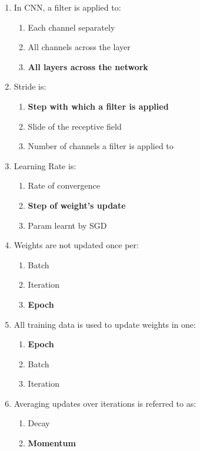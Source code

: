 \documentclass{report}
\numberwithin{equation}{section}
\begin{document}
\begin{enumerate}
    \item In CNN, a filter is applied to:
    \begin{enumerate}[label=\alph*.]
        \item Each channel separately
        \item All channels across the layer
        \item \textbf{All layers across the network}
    \end{enumerate}
    \item Stride is:
    \begin{enumerate}[label=\alph*.]
        \item \textbf{Step with which a filter is applied}
        \item Slide of the receptive field
        \item Number of channels a filter is applied to
    \end{enumerate}
    \item Learning Rate is:
    \begin{enumerate}[label=\alph*.]
        \item Rate of convergence
        \item \textbf{Step of weight's update}
        \item Param learnt by SGD
    \end{enumerate}
    \item Weights are not updated once per:
    \begin{enumerate}[label=\alph*.]
        \item Batch
        \item Iteration
        \item \textbf{Epoch}
    \end{enumerate}
    \item All training data is used to update weights in one:
    \begin{enumerate}[label=\alph*.]
        \item \textbf{Epoch}
        \item Batch
        \item Iteration
    \end{enumerate}
    \item Averaging updates over iterations is referred to as:
    \begin{enumerate}[label=\alph*.]
        \item Decay
        \item \textbf{Momentum}

\end{enumerate}
\end{enumerate}
\end{document}
